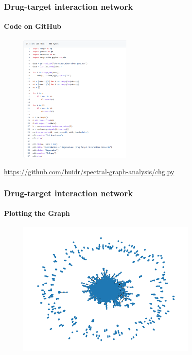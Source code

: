 \documentclass[aspectratio=43,leqno]{beamer}
\begin{document}
\begin{frame}
    \frametitle{Drug-target interaction network}
  \framesubtitle{Code on GitHub}

 \begin{figure}[h]
    \centering
    \includegraphics[width=0.5\textwidth]{images/chg-code.png}
    \label{fig:mesh1}
  \end{figure}
  \hyperref{https://github.com/huidr/spectral-graph-analysis/tfg.py}{}{}{https://github.com/huidr/spectral-graph-analysis/chg.py}
  
\end{frame}

\begin{frame}
    \frametitle{Drug-target interaction network}
  \framesubtitle{Plotting the Graph}

 \begin{figure}[h]
    \centering
    \includegraphics[width=0.8\textwidth]{images/chg-graph.png}
    \label{fig:mesh1}
  \end{figure}
  
\end{frame}
\end{document}
